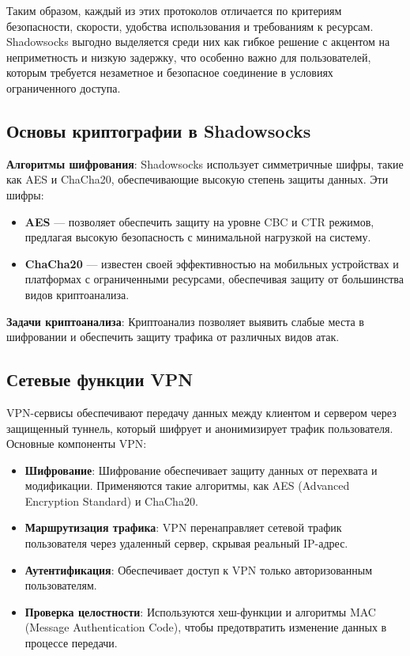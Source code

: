 \documentclass{SCWorks}
\begin{document}
Таким образом, каждый из этих протоколов отличается по критериям безопасности, скорости, удобства использования и требованиям к ресурсам. Shadowsocks выгодно выделяется среди них как гибкое решение с акцентом на неприметность и низкую задержку, что особенно важно для пользователей, которым требуется незаметное и безопасное соединение в условиях ограниченного доступа.

\subsection{Основы криптографии в Shadowsocks}

\textbf{Алгоритмы шифрования}: Shadowsocks использует симметричные шифры, такие как AES и ChaCha20, обеспечивающие высокую степень защиты данных. Эти шифры:
\begin{itemize}
    \item \textbf{AES} --- позволяет обеспечить защиту на уровне CBC и CTR режимов, предлагая высокую безопасность с минимальной нагрузкой на систему.
    \item \textbf{ChaCha20} --- известен своей эффективностью на мобильных устройствах и платформах с ограниченными ресурсами, обеспечивая защиту от большинства видов криптоанализа.
\end{itemize}

\textbf{Задачи криптоанализа}: Криптоанализ позволяет выявить слабые места в шифровании и обеспечить защиту трафика от различных видов атак.

\newpage

\subsection{Сетевые функции VPN}
VPN-сервисы обеспечивают передачу данных между клиентом и сервером через защищенный туннель, который шифрует и анонимизирует трафик пользователя. Основные компоненты VPN:

\begin{itemize}
    \item \textbf{Шифрование}: Шифрование обеспечивает защиту данных от перехвата и модификации. Применяются такие алгоритмы, как AES (Advanced Encryption Standard) и ChaCha20.
    \item \textbf{Маршрутизация трафика}: VPN перенаправляет сетевой трафик пользователя через удаленный сервер, скрывая реальный IP-адрес.
    \item \textbf{Аутентификация}: Обеспечивает доступ к VPN только авторизованным пользователям.
    \item \textbf{Проверка целостности}: Используются хеш-функции и алгоритмы MAC (Message Authentication Code), чтобы предотвратить изменение данных в процессе передачи.
\end{itemize}
\end{document}
